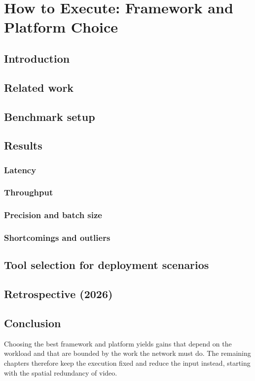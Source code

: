 \chapter{How to Execute: Framework and Platform Choice}
\label{ch:how}


\section{Introduction}

\section{Related work}

\section{Benchmark setup}

\section{Results}
\subsection{Latency}
\subsection{Throughput}
\subsection{Precision and batch size}
\subsection{Shortcomings and outliers}

\section{Tool selection for deployment scenarios}

\section{Retrospective (2026)}
\label{sec:how:retro}

\section{Conclusion}

\begin{bridge}
Choosing the best framework and platform yields gains that depend on the
workload and that are bounded by the work the network must do. The remaining
chapters therefore keep the execution fixed and reduce the input instead,
starting with the spatial redundancy of video.
\end{bridge}
